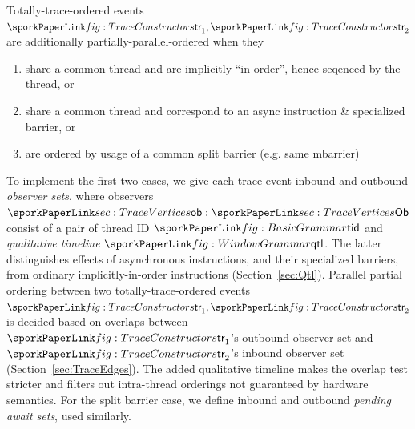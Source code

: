 Totally-trace-ordered events $\sporktr_1,\sporktr_2$ are additionally partially-parallel-ordered when they
\begin{enumerate}
  \item share a common thread and are implicitly ``in-order'', hence seqenced by the thread, or
  \item share a common thread and correspond to an async instruction \& specialized barrier, or
  \item are ordered by usage of a common split barrier (e.g. same mbarrier)
\end{enumerate}
To implement the first two cases,
we give each trace event inbound and outbound \emph{observer sets},
where observers $\sporkob: \sporkOb$ consist of a pair of thread ID $\sporktid$  %
and \emph{qualitative timeline} $\sporkqtl$.
The latter distinguishes effects of asynchronous instructions, and their specialized barriers,
from ordinary implicitly-in-order instructions (Section~\ref{sec:Qtl}).
Parallel partial ordering between two totally-trace-ordered events $\sporktr_1,\sporktr_2$ is  %
decided based on overlaps between $\sporktr_1$'s outbound observer set and $\sporktr_2$'s inbound observer set (Section~\ref{sec:TraceEdges}).
The added qualitative timeline makes the overlap test stricter and filters out intra-thread orderings not guaranteed by hardware semantics.
For the split barrier case, we define inbound and outbound \emph{pending await sets}, used similarly.



